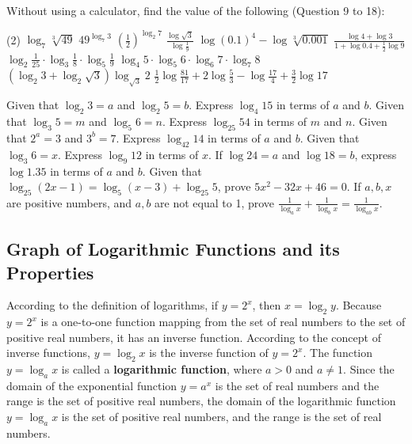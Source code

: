 \documentclass{report}
\begin{document}
\noindent Without using a calculator, find the value of the following (Question 9 to 18):
\begin{tasks}[label=\arabic*., start=9](2)
	\task $\displaystyle\log _7 \sqrt[3]{49}$
	\task $\displaystyle49^{\log _7 3}$
	\task $\displaystyle\left(\frac{1}{2}\right)^{\log _2 7}$
	\task $\displaystyle\frac{\log \sqrt{3}}{\log \frac{1}{9}}$
	\task $\displaystyle\log (0.1)^4-\log \sqrt[3]{0.001}$
	\task $\displaystyle\frac{\log 4+\log 3}{1+\log 0.4+\frac{1}{2} \log 9}$
	\task $\displaystyle\log _2 \frac{1}{25} \cdot \log _3 \frac{1}{8} \cdot \log _5 \frac{1}{9}$
	\task $\displaystyle\log _4 5 \cdot \log _5 6 \cdot \log _6 7 \cdot \log _7 8$
	\task $\displaystyle\left(\log _2 3+\log _2 \sqrt{3}\right) \log _{\sqrt{3}} 2$
	\task $\displaystyle\frac{1}{2} \log \frac{81}{17}+2 \log \frac{5}{3}-\log \frac{17}{4}+\frac{3}{2} \log 17$
\end{tasks}
\begin{tasks}[label=\arabic*, resume]
	\task Given that $\log _2 3=a$ and $\log _2 5=b$. Express $\log _4 15$ in terms of $a$ and $b$.
	\task Given that $\log _3 5=m$ and $\log _5 6=n$. Express $\log _{25} 54$ in terms of $m$ and $n$.
	\task Given that $2^a=3$ and $3^b=7$. Express $\log _{42} 14$ in terms of $a$ and $b$.
	\task Given that $\log _3 6=x$. Express $\log _9 12$ in terms of $x$.
	\task If $\log 24=a$ and $\log 18=b$, express $\log 1.35$ in terms of $a$ and $b$.
	\task Given that $\log _{25}(2 x-1)=\log _5(x-3)+\log _{25} 5$, prove $5 x^2-32 x+46=0$.
	\task If $a, b, x$ are positive numbers, and $a, b$ are not equal to 1, prove $\displaystyle\frac{1}{\log _a x}+\frac{1}{\log _b x}=\frac{1}{\log _{a b} x}$.
\end{tasks}

\subsection*{Graph of Logarithmic Functions and its Properties}

According to the definition of logarithms, if $y=2^x$, then $x=\log _2 y$. Because $y=2^x$ is a one-to-one function mapping from the set of real numbers to the set of positive real numbers, it has an inverse function. According to the concept of inverse functions, $y=\log _2 x$ is the inverse function of $y=2^x$. The function $y=\log _a x$ is called a \textbf{logarithmic function}, where $a>0$ and $a \neq 1$. Since the domain of the exponential function $y=a^x$ is the set of real numbers and the range is the set of positive real numbers, the domain of the logarithmic function $y=\log _a x$ is the set of positive real numbers, and the range is the set of real numbers.
\end{document}
